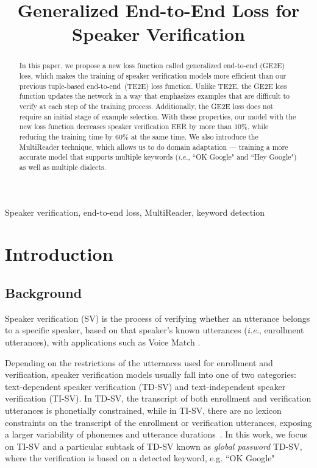 \documentclass{article}
\title{Generalized End-to-End Loss for Speaker Verification}
\newcommand{\ie}{\textit{i.e.}, }
\begin{document}
\ninept
\maketitle
\begin{abstract}
In this paper, we propose a new loss function called
generalized end-to-end (GE2E) loss, which makes the training of speaker
verification models more efficient than our previous tuple-based end-to-end~(TE2E) loss function.
Unlike TE2E, the GE2E loss function updates the network in a
way that emphasizes examples that are difficult to verify at each step of the
training process. Additionally, the GE2E loss does not require an initial stage
of example selection. With these properties, our model with the new loss function
decreases speaker verification EER by more than $10\% $, while reducing
the training time by $60\%$ at the same time.
We also introduce the MultiReader technique, which allows us to do domain
adaptation --- training a more accurate model that supports multiple
keywords (\ie ``OK Google" and ``Hey Google") as well as multiple dialects.

\end{abstract}
\begin{keywords}
Speaker verification, end-to-end loss, MultiReader, keyword detection
\end{keywords}
\section{Introduction}
\label{sec:intro}

\subsection{Background}
Speaker verification (SV) is the process of verifying whether an utterance
belongs to a specific speaker, based on that speaker's known utterances
(\ie enrollment utterances), with applications such as Voice Match \cite{multiuser,voicematch}.



Depending on the restrictions of the utterances used for enrollment and
verification, speaker verification models usually fall into one of two
categories: text-dependent speaker verification (TD-SV) and
text-independent speaker verification (TI-SV). In TD-SV,
the transcript of both enrollment and verification utterances is phonetially
constrained, while in TI-SV, there are no lexicon constraints on the
transcript of the enrollment or verification utterances, exposing a larger
variability of phonemes and utterance durations~\cite{kinnunen2010overview,bimbot2004tutorial}.
In this work, we focus on TI-SV and a particular subtask of TD-SV known as \emph{global password}
TD-SV, where the verification is based on a detected keyword, e.g. ``OK Google"~\cite{chen2014small,prabhavalkar2015automatic}
\end{document}
